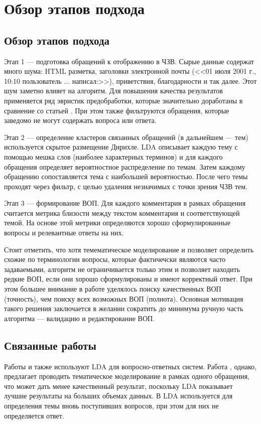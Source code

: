 \chapter{Обзор этапов подхода}
\label{chap:overview}
\section{Обзор этапов подхода}
\label{sec:overview}
Этап 1 --- подготовка обращений к отображению в ЧЗВ. Сырые данные содержат много шума: HTML разметка, заголовки электронной почты (<<01 июля 2001 г., 10:10 пользователь ... написал:>>), приветствия, благодарности и так далее. Этот шум заметно влияет на алгоритм. Для повышения качества результатов применяется ряд эвристик предобработки, которые значительно доработаны в сравнение со статьей \cite{original}. При этом также фильтруются обращения, которые заведомо не могут содержать вопроса или ответа. 

Этап 2 --- определение кластеров связанных обращений (в дальнейшем --- тем) используется скрытое размещение Дирихле. LDA описывает каждую тему с помощью мешка слов (наиболее характерных терминов) и для каждого обращения определяет вероятностное распределение по темам. Затем каждому обращению сопоставляется тема с наибольшей вероятностью. После чего темы проходят через фильтр, с целью удаления незначимых с точки зрения ЧЗВ тем.

Этап 3 --- формирование ВОП. Для каждого комментария в рамках обращения считается метрика близости между текстом комментария и соответствующей темой. На основе этой метрики определяются хорошо сформулированные вопросы и релевантные ответы на них.

Стоит отметить, что хотя темематическое моделирование и позволяет определить схожие по терминологии вопросы, которые фактичечски являются часто задаваемыми, алгоритм не ограничивается только этим и позволяет находить редкие ВОП, если они хорошо сформулированы и имеют корректный ответ. При этом большее внимание в работе уделялось поиску качественных ВОП (точность), чем поиску всех возможных ВОП (полнота). Основная мотивация такого решения заключается в желании сократить до минимума ручную часть алгоритма --- валидацию и редактирование ВОП.
\section{Связанные работы}
\label{sec:researches}
Работы \cite{LDA1} и \cite{LDA2} также используют LDA для вопросно-ответных систем. Работа \cite{LDA1}, однако, предлагает проводить тематическое моделирование в рамках одного обращения, что может дать менее качественный результат, поскольку LDA показывает лучшие результаты на больших объемах данных. В \cite{LDA2} LDA используется для определения темы вновь поступивших вопросов, при этом для них не определяется ответ.

